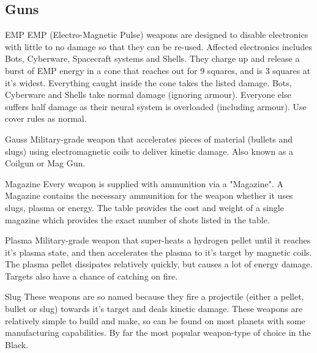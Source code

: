 \subsection{Guns}

\begin{multicols}{2}

\begin{genericsection}{EMP}
EMP (Electro-Magnetic Pulse) weapons are designed to disable electronics with little to no damage so that they can be re-used. Affected electronics includes Bots, Cyberware, Spacecraft systems and Shells. They charge up and release a burst of EMP energy in a cone that reaches out for 9 squares, and is 3 squares at it's widest. Everything caught inside the cone takes the listed damage. Bots, Cyberware and Shells take normal damage (ignoring armour). Everyone else suffers half damage as their neural system is overloaded (including armour). Use cover rules as normal.
\end{genericsection}

\begin{genericsection}{Gauss}
Military-grade weapon that accelerates pieces of material (bullets and slugs) using electromagnetic coils to deliver kinetic damage. Also known as a Coilgun or Mag Gun.
\end{genericsection}

\begin{genericsection}{Magazine}
Every weapon is supplied with ammunition via a "Magazine". A Magazine contains the necessary ammunition for the weapon whether it uses slugs, plasma or energy. The table provides the cost and weight of a single magazine which provides the exact number of shots listed in the table.
\end{genericsection}

\begin{genericsection}{Plasma}
Military-grade weapon that super-heats a hydrogen pellet until it reaches it's plasma state, and then accelerates the plasma to it's target by magnetic coils. The plasma pellet dissipates relatively quickly, but causes a lot of energy damage. Targets also have a chance of catching on fire.
\end{genericsection}

\begin{genericsection}{Slug}
These weapons are so named because they fire a projectile (either a pellet, bullet or slug) towards it's target and deals kinetic damage. These weapons are relatively simple to build and make, so can be found on most planets with some manufacturing capabilities. By far the most popular weapon-type of choice in the Black.
\end{genericsection}


\end{multicols}
